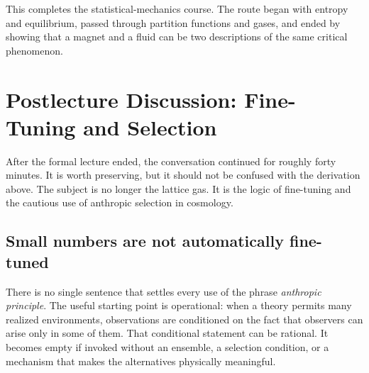 \begin{classroomqa}
\end{classroomqa}

\begin{classroomqa}
\end{classroomqa}

This completes the statistical-mechanics course. The route began with entropy and equilibrium, passed through partition functions and gases, and ended by showing that a magnet and a fluid can be two descriptions of the same critical phenomenon.

\section{Postlecture Discussion: Fine-Tuning and Selection}

After the formal lecture ended, the conversation continued for roughly forty minutes. It is worth preserving, but it should not be confused with the derivation above. The subject is no longer the lattice gas. It is the logic of fine-tuning and the cautious use of anthropic selection in cosmology.

\subsection{Small numbers are not automatically fine-tuned}

There is no single sentence that settles every use of the phrase \emph{anthropic principle}. The useful starting point is operational: when a theory permits many realized environments, observations are conditioned on the fact that observers can arise only in some of them. That conditional statement can be rational. It becomes empty if invoked without an ensemble, a selection condition, or a mechanism that makes the alternatives physically meaningful.

